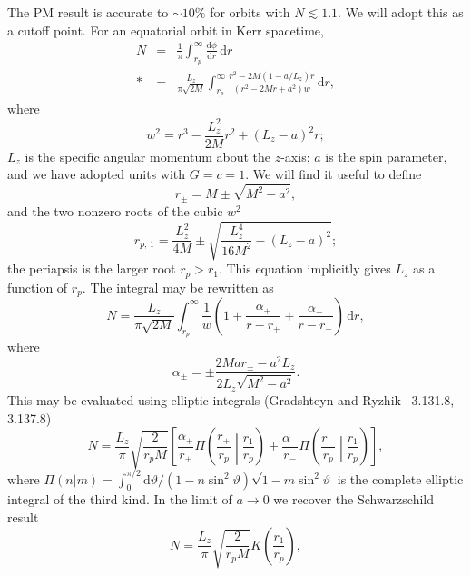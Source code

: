 \documentclass[aps,prd,amsfonts,amssymb,amsmath,nofootinbib,floatfix,reprint,showpacs,groupedaddress]{revtex4-1}
\newcommand{\dd}{\ensuremath{\mathrm{d}}}
\newcommand{\diff}[2]{\ensuremath{\frac{\dd {#1}}{\dd {#2}}}}
\newcommand{\intd}[4]{\ensuremath{\int_{#1}^{#2}{#3}\,\dd{#4}}}
\newcommand{\recip}[1]{\ensuremath{\frac{1}{#1}}}
\begin{document}
The PM result is accurate to $\sim 10\%$ for orbits with $N \lesssim 1.1$. We will adopt this as a cutoff point. For an equatorial orbit in Kerr spacetime,
\begin{eqnarray}
N & = & \recip{\pi}\intd{r_{p}}{\infty}{\diff{\phi}{r}}{r} \nonumber \\*
 & = & \frac{L_z}{\pi\sqrt{2M}}\intd{r_{p}}{\infty}{\frac{r^2 - 2M(1 - a/L_z)r}{(r^2 - 2Mr + a^2)w}}{r},
\end{eqnarray}
where
\begin{equation}
w^2 = r^3 - \frac{L_z^2}{2M}r^2 + (L_z - a)^2r;
\end{equation}
$L_z$ is the specific angular momentum about the $z$-axis; $a$ is the spin parameter, and we have adopted units with $G = c = 1$. We will find it useful to define
\begin{equation}
r_\pm = M \pm \sqrt{M^2 - a^2},
\end{equation}
and the two nonzero roots of the cubic $w^2$
\begin{equation}
r_{p,\,1} = \frac{L_z^2}{4M} \pm \sqrt{\frac{L_z^4}{16M^2} - (L_z -a)^2};
\end{equation}
the periapsis is the larger root $r_{p} > r_1$. This equation implicitly gives $L_z$ as a function of $r_p$. The integral may be rewritten as
\begin{equation}
N = \frac{L_z}{\pi\sqrt{2M}}\intd{r_{p}}{\infty}{\recip{w}\left(1 + \frac{\alpha_+}{r-r_+} + \frac{\alpha_-}{r-r_-}\right)}{r},
\end{equation}
where
\begin{equation}
\alpha_\pm = \pm\frac{2Mar_\pm - a^2L_z}{2L_z\sqrt{M^2-a^2}}.
\end{equation}
This may be evaluated using elliptic integrals (Gradshteyn and Ryzhik~\cite{Gradshteyn2000} 3.131.8, 3.137.8)
\begin{equation}
N = \frac{L_z}{\pi}\sqrt{\frac{2}{r_{p}M}}\left[\frac{\alpha_+}{r_+}\Pi\left(\frac{r_+}{r_{p}}\middle|\frac{r_1}{r_{p}}\right) + \frac{\alpha_-}{r_-}\Pi\left(\frac{r_-}{r_{p}}\middle|\frac{r_1}{r_{p}}\right)\right],
\end{equation}
where $\Pi(n|m) = \int_{0}^{\pi/2}{\dd\vartheta/(1-n\sin^2\vartheta)\sqrt{1-m\sin^2\vartheta}}$ is the complete elliptic integral of the third kind. In the limit of $a \rightarrow 0$ we recover the Schwarzschild result~\cite{Cutler1994}
\begin{equation}
N = \frac{L_z}{\pi}\sqrt{\frac{2}{r_{p}M}}K\left(\frac{r_1}{r_{p}}\right),
\end{equation}
\end{document}
